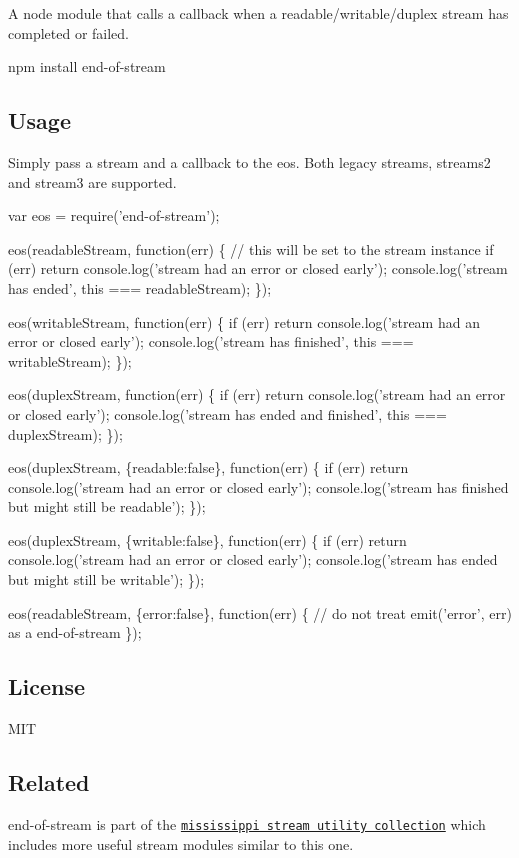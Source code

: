 A node module that calls a callback when a readable/writable/duplex stream has completed or failed.

npm install end-\/of-\/stream

\subsection*{Usage}

Simply pass a stream and a callback to the {\ttfamily eos}. Both legacy streams, streams2 and stream3 are supported.


\begin{DoxyCode}
var eos = require('end-of-stream');

eos(readableStream, function(err) \{
  // this will be set to the stream instance
  if (err) return console.log('stream had an error or closed early');
  console.log('stream has ended', this === readableStream);
\});

eos(writableStream, function(err) \{
  if (err) return console.log('stream had an error or closed early');
  console.log('stream has finished', this === writableStream);
\});

eos(duplexStream, function(err) \{
  if (err) return console.log('stream had an error or closed early');
  console.log('stream has ended and finished', this === duplexStream);
\});

eos(duplexStream, \{readable:false\}, function(err) \{
  if (err) return console.log('stream had an error or closed early');
  console.log('stream has finished but might still be readable');
\});

eos(duplexStream, \{writable:false\}, function(err) \{
  if (err) return console.log('stream had an error or closed early');
  console.log('stream has ended but might still be writable');
\});

eos(readableStream, \{error:false\}, function(err) \{
  // do not treat emit('error', err) as a end-of-stream
\});
\end{DoxyCode}


\subsection*{License}

M\+IT

\subsection*{Related}

{\ttfamily end-\/of-\/stream} is part of the \href{https://github.com/maxogden/mississippi}{\tt mississippi stream utility collection} which includes more useful stream modules similar to this one. 